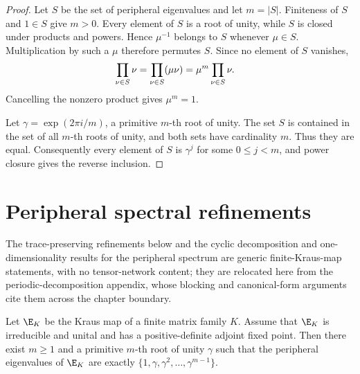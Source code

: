 \begin{proof}
    \leanok
    Let $S$ be the set of peripheral eigenvalues and let $m=|S|$.
    Finiteness of $S$ and $1\in S$ give $m>0$. Every element of $S$ is a root
    of unity, while $S$ is closed under products and powers. Hence $\mu^{-1}$
    belongs to $S$ whenever $\mu\in S$. Multiplication by such a $\mu$
    therefore permutes $S$. Since no element of $S$ vanishes,
    \begin{align}
        \prod_{\nu\in S}\nu
         & =\prod_{\nu\in S}(\mu\nu)
          =\mu^m\prod_{\nu\in S}\nu.
        \notag
    \end{align}
    Cancelling the nonzero product gives $\mu^m=1$.

    Let $\gamma=\exp(2\pi i/m)$, a primitive $m$-th root of unity. The set
    $S$ is contained in the set of all $m$-th roots of unity, and both sets
    have cardinality $m$. Thus they are equal. Consequently every element of
    $S$ is $\gamma^j$ for some $0\leq j<m$, and power closure gives the reverse
    inclusion.
\end{proof}

\section{Peripheral spectral refinements}%
\label{sec:peripheral_refinements}

The trace-preserving refinements below and the cyclic decomposition and
one-dimensionality results for the peripheral spectrum are generic
finite-Kraus-map statements, with no tensor-network content; they are
relocated here from the periodic-decomposition appendix, whose blocking and
canonical-form arguments cite them across the chapter boundary.

\begin{theorem}
    \label{thm:transfer_peripheral_cyclic_structure}
    \leanok
    Let $\E_K$ be the Kraus map of a finite matrix family $K$. Assume that
    $\E_K$ is irreducible and unital and has a positive-definite adjoint fixed
    point. Then there exist $m\geq1$ and a primitive $m$-th root of unity
    $\gamma$ such that the peripheral eigenvalues of $\E_K$ are exactly
    $\{1,\gamma,\gamma^2,\ldots,\gamma^{m-1}\}$.
\end{theorem}


